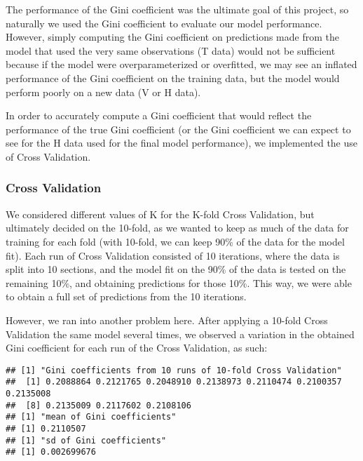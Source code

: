 \documentclass[a4paper]{article}\usepackage[]{graphicx}\usepackage[]{color}
\makeatletter
\newenvironment{kframe}{%
 \def\at@end@of@kframe{}%
 \ifinner\ifhmode%
  \def\at@end@of@kframe{\end{minipage}}%
  \begin{minipage}{\columnwidth}%
 \fi\fi%
 \def\FrameCommand##1{\hskip\@totalleftmargin \hskip-\fboxsep
 \colorbox{shadecolor}{##1}\hskip-\fboxsep
     \hskip-\linewidth \hskip-\@totalleftmargin \hskip\columnwidth}%
 \MakeFramed {\advance\hsize-\width
   \@totalleftmargin\z@ \linewidth\hsize
   \@setminipage}}%
 {\par\unskip\endMakeFramed%
 \at@end@of@kframe}
\newenvironment{knitrout}{}{} %
\makeatother
\begin{document}
The performance of the Gini coefficient was the ultimate goal of this project, so naturally we used the Gini coefficient to evaluate our model performance. However, simply computing the Gini coefficient on predictions made from the model that used the very same observations (T data) would not be sufficient because if the model were overparameterized or overfitted, we may see an inflated performance of the Gini coefficient on the training data, but the model would perform poorly on a new data (V or H data). 

In order to accurately compute a Gini coefficient that would reflect the performance of the true Gini coefficient (or the Gini coefficient we can expect to see for the H data used for the final model performance), we implemented the use of Cross Validation.

\subsubsection*{Cross Validation}
We considered different values of K for the K-fold Cross Validation, but ultimately decided on the 10-fold, as we wanted to keep as much of the data for training for each fold (with 10-fold, we can keep 90\% of the data for the model fit). Each run of Cross Validation consisted of 10 iterations, where the data is split into 10 sections, and the model fit on the 90\% of the data is tested on the remaining 10\%, and obtaining predictions for those 10\%. This way, we were able to obtain a full set of predictions from the 10 iterations. 

However, we ran into another problem here. After applying a 10-fold Cross Validation the same model several times, we observed a variation in the obtained Gini coefficient for each run of the  Cross Validation, as such:

\begin{knitrout}
\color{fgcolor}\begin{kframe}
\begin{verbatim}
## [1] "Gini coefficients from 10 runs of 10-fold Cross Validation"
##  [1] 0.2088864 0.2121765 0.2048910 0.2138973 0.2110474 0.2100357 0.2135008
##  [8] 0.2135009 0.2117602 0.2108106
## [1] "mean of Gini coefficients"
## [1] 0.2110507
## [1] "sd of Gini coefficients"
## [1] 0.002699676
\end{verbatim}
\end{kframe}
\end{knitrout}
\end{document}
